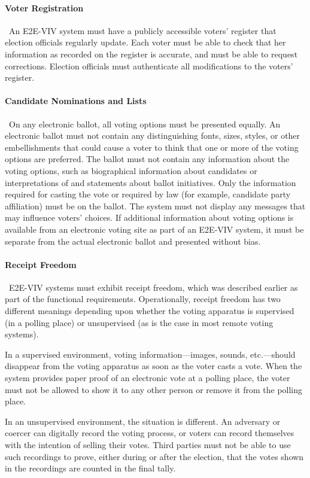 \paragraph{Voter Registration} \ An E2E-VIV system must have a
publicly accessible voters' register that election officials regularly
update. Each voter must be able to check that her information as
recorded on the register is accurate, and must be able to request
corrections. Election officials must authenticate all modifications to
the voters' register.

\paragraph{Candidate Nominations and Lists} \ On any electronic
ballot, all voting options must be presented equally. An electronic
ballot must not contain any distinguishing fonts, sizes, styles, or
other embellishments that could cause a voter to think that one or
more of the voting options are preferred. The ballot must not contain
any information about the voting options, such as biographical
information about candidates or interpretations of and statements
about ballot initiatives. Only the information required for casting
the vote or required by law (for example, candidate party affiliation)
must be on the ballot. The system must not display any messages that
may influence voters' choices. If additional information about voting
options is available from an electronic voting site as part of an
E2E-VIV system, it must be separate from the actual electronic ballot
and presented without bias.

\paragraph{Receipt Freedom} \ E2E-VIV systems must exhibit receipt
freedom, which was described earlier as part of the functional
requirements. Operationally, receipt freedom has two different
meanings depending upon whether the voting apparatus is supervised (in
a polling place) or unsupervised (as is the case in most remote voting
systems).

In a supervised environment, voting information---images, sounds,
etc.---should disappear from the voting apparatus as soon as the voter
casts a vote. When the system provides paper proof of an electronic
vote at a polling place, the voter must not be allowed to show it to
any other person or remove it from the polling place.

In an unsupervised environment, the situation is different. An
adversary or coercer can digitally record the voting process, or
voters can record themselves with the intention of selling their
votes. Third parties must not be able to use such recordings to prove,
either during or after the election, that the votes shown in the
recordings are counted in the final tally.

